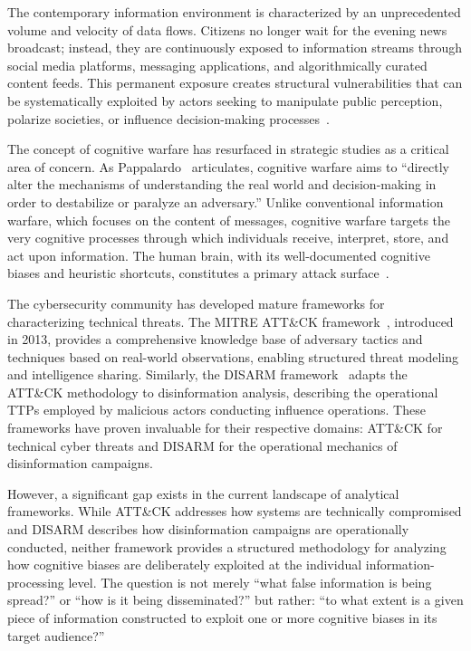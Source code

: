 \documentclass[11pt,a4paper]{article}
\begin{document}
The contemporary information environment is characterized by an unprecedented volume and velocity of data flows. Citizens no longer wait for the evening news broadcast; instead, they are continuously exposed to information streams through social media platforms, messaging applications, and algorithmically curated content feeds. This permanent exposure creates structural vulnerabilities that can be systematically exploited by actors seeking to manipulate public perception, polarize societies, or influence decision-making processes~\cite{wardle2017, benkler2018}.

The concept of cognitive warfare has resurfaced in strategic studies as a critical area of concern. As Pappalardo~\cite{pappalardo2023} articulates, cognitive warfare aims to ``directly alter the mechanisms of understanding the real world and decision-making in order to destabilize or paralyze an adversary.'' Unlike conventional information warfare, which focuses on the content of messages, cognitive warfare targets the very cognitive processes through which individuals receive, interpret, store, and act upon information. The human brain, with its well-documented cognitive biases and heuristic shortcuts, constitutes a primary attack surface~\cite{kahneman2011, claverie2022}.

The cybersecurity community has developed mature frameworks for characterizing technical threats. The MITRE ATT\&CK framework~\cite{strom2020}, introduced in 2013, provides a comprehensive knowledge base of adversary tactics and techniques based on real-world observations, enabling structured threat modeling and intelligence sharing. Similarly, the DISARM framework~\cite{terp2022} adapts the ATT\&CK methodology to disinformation analysis, describing the operational TTPs employed by malicious actors conducting influence operations. These frameworks have proven invaluable for their respective domains: ATT\&CK for technical cyber threats and DISARM for the operational mechanics of disinformation campaigns.

However, a significant gap exists in the current landscape of analytical frameworks. While ATT\&CK addresses how systems are technically compromised and DISARM describes how disinformation campaigns are operationally conducted, neither framework provides a structured methodology for analyzing how cognitive biases are deliberately exploited at the individual information-processing level. The question is not merely ``what false information is being spread?'' or ``how is it being disseminated?'' but rather: ``to what extent is a given piece of information constructed to exploit one or more cognitive biases in its target audience?''
\end{document}
